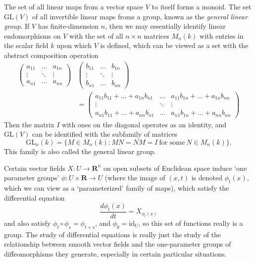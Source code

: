 \begin{example}
    The set of all linear maps from a vector space $V$ to itself forms a monoid. The set $\mathrm{GL}(V)$ of all invertible linear maps froms a group, known as the \emph{general linear group}. If $V$ has finite-dimension $n$, then we may essentially identify linear endomorphisms on $V$ with the set of all $n\times n$ matrices $M_n(k)$ with entries in the scalar field $k$ upon which $V$ is defined, which can be viewed as a set with the abstract composition operation
    \begin{align*}
        \begin{pmatrix} a_{11} & \dots & a_{1n} \\ \vdots & \ddots & \vdots \\ a_{n1} & \dots & a_{nn} \end{pmatrix} & \begin{pmatrix} b_{11} & \dots & b_{1n} \\ \vdots & \ddots & \vdots \\ b_{n1} & \dots & b_{nn} \end{pmatrix}\\
        &= \begin{pmatrix} a_{11}b_{11} + \dots + a_{1n}b_{n1} & \dots & a_{11}b_{1n} + \dots + a_{1n}b_{nn} \\ \vdots & \ddots & \vdots \\ a_{n1}b_{11} + \dots + a_{nn}b_{n1} & \dots & a_{n1}b_{1n} + \dots + a_{nn}b_{nn} \end{pmatrix}
    \end{align*}
    Then the matrix $I$ with ones on the diagonal operates as an identity, and $\mathrm{GL}(V)$ can be identified with the subfamily of matrices
    \[ \mathrm{GL}_n(k) = \{ M \in M_n(k) : MN = NM = I\ \text{for some}\ N \in M_n(k) \}. \]
    This family is also called the general linear group.
\end{example}

\begin{example}
    Certain vector fields $X: U \to \mathbf{R}^n$ on open subsets of Euclidean space induce `one parameter groups' $\phi: U \times \mathbf{R} \to U$ (where the image of $(x,t)$ is denoted $\phi_t(x)$, which we can view as a `parameterized' family of maps), which satisfy the differential equation
    \[ \frac{d \phi_t(x)}{dt} = X_{\phi_t(x)} \]
    and also satisfy $\phi_t \circ \phi_s = \phi_{t + s}$, and $\phi_0 = \text{id}_U$, so this set of functions really is a group. The study of differential equations is really just the study of the relationship between smooth vector fields and the one-parameter groups of diffeomorphisms they generate, especially in certain particular situations.
\end{example}

